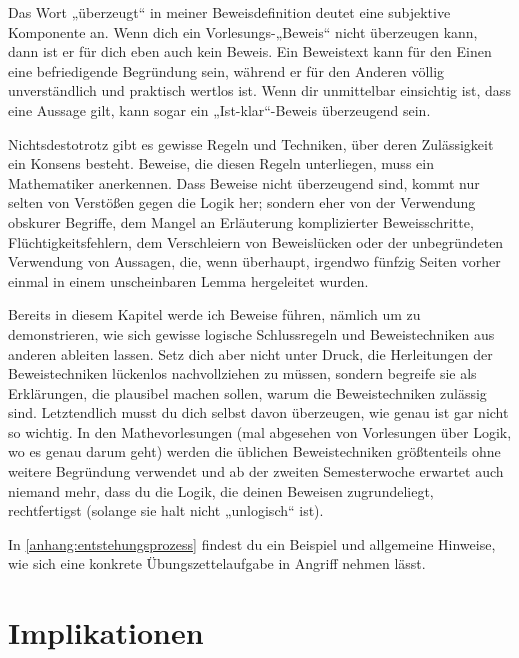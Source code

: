 \begin{bem}
    Das Wort „überzeugt“ in meiner Beweisdefinition deutet eine subjektive Komponente an. Wenn dich ein Vorlesungs-„Beweis“ nicht überzeugen kann, dann ist er für dich eben auch kein Beweis. Ein Beweistext kann für den Einen eine befriedigende Begründung sein, während er für den Anderen völlig unverständlich und praktisch wertlos ist. Wenn dir unmittelbar einsichtig ist, dass eine Aussage gilt, kann sogar ein „Ist-klar“-Beweis überzeugend sein.
    
    Nichtsdestotrotz gibt es gewisse Regeln und Techniken, über deren Zulässigkeit ein Konsens besteht. Beweise, die diesen Regeln unterliegen, muss ein Mathematiker anerkennen. Dass Beweise nicht überzeugend sind, kommt nur selten von Verstößen gegen die Logik her; sondern eher von der Verwendung obskurer Begriffe, dem Mangel an Erläuterung komplizierter Beweisschritte, Flüchtigkeitsfehlern, dem Verschleiern von Beweislücken oder der unbegründeten Verwendung von Aussagen, die, wenn überhaupt, irgendwo fünfzig Seiten vorher einmal in einem unscheinbaren Lemma hergeleitet wurden.
\end{bem}


Bereits in diesem Kapitel werde ich Beweise führen, nämlich um zu demonstrieren, wie sich gewisse logische Schlussregeln und Beweistechniken aus anderen ableiten lassen. Setz dich aber nicht unter Druck, die Herleitungen der Beweistechniken lückenlos nachvollziehen zu müssen, sondern begreife sie als Erklärungen, die plausibel machen sollen, warum die Beweistechniken zulässig sind. Letztendlich musst du dich selbst davon überzeugen, wie genau ist gar nicht so wichtig. In den Mathevorlesungen (mal abgesehen von Vorlesungen über Logik, wo es genau darum geht) werden die üblichen Beweistechniken größtenteils ohne weitere Begründung verwendet und ab der zweiten Semesterwoche erwartet auch niemand mehr, dass du die Logik, die deinen Beweisen zugrundeliegt, rechtfertigst (solange sie halt nicht „unlogisch“ ist).


\begin{bem}
    In \cref{anhang:entstehungsprozess} findest du ein Beispiel und allgemeine Hinweise, wie sich eine konkrete Übungszettelaufgabe in Angriff nehmen lässt.
\end{bem}





\section{Implikationen}


